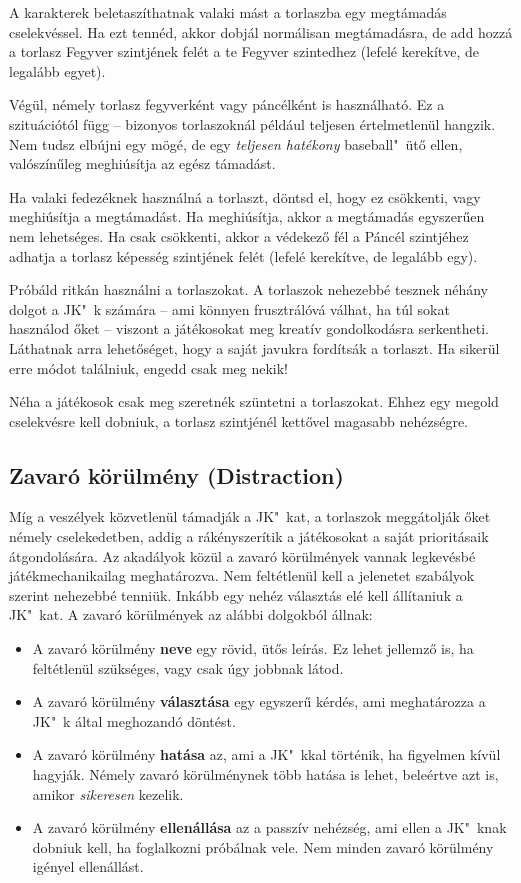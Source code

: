 A karakterek beletaszíthatnak valaki mást a torlaszba egy megtámadás cselekvéssel. Ha ezt tennéd, akkor dobjál normálisan megtámadásra, de add hozzá a torlasz Fegyver szintjének felét a te Fegyver szintedhez (lefelé kerekítve, de legalább egyet).

Végül, némely torlasz fegyverként vagy páncélként is használható. Ez a szituációtól függ -- bizonyos torlaszoknál például teljesen értelmetlenül hangzik. Nem tudsz elbújni egy  mögé, de egy  \emph{teljesen hatékony} baseball"~ütő ellen, valószínűleg meghiúsítja az egész támadást.

Ha valaki fedezéknek használná a torlaszt, döntsd el, hogy ez csökkenti, vagy meghiúsítja a megtámadást. Ha meghiúsítja, akkor a megtámadás egyszerűen nem lehetséges. Ha csak csökkenti, akkor a védekező fél a Páncél szintjéhez adhatja a torlasz képesség szintjének felét (lefelé kerekítve, de legalább egy).

Próbáld ritkán használni a torlaszokat. A torlaszok nehezebbé tesznek néhány dolgot a JK"~k számára -- ami könnyen frusztrálóvá válhat, ha túl sokat használod őket -- viszont a játékosokat meg kreatív gondolkodásra serkentheti. Láthatnak arra lehetőséget, hogy a saját javukra fordítsák a torlaszt. Ha sikerül erre módot találniuk, engedd csak meg nekik!

Néha a játékosok csak meg szeretnék szüntetni a torlaszokat. Ehhez egy megold cselekvésre kell dobniuk, a torlasz szintjénél kettővel magasabb nehézségre.

\newpage

\subsection[Zavaró körülmény]{Zavaró körülmény (Distraction)}

Míg a veszélyek közvetlenül támadják a JK"~kat, a torlaszok meggátolják őket némely cselekedetben, addig a  rákényszerítik a játékosokat a saját prioritásaik átgondolására. Az akadályok közül a zavaró körülmények vannak legkevésbé játékmechanikailag meghatározva. Nem feltétlenül kell a jelenetet szabályok szerint nehezebbé tenniük. Inkább egy nehéz választás elé kell állítaniuk a JK"~kat. A zavaró körülmények az alábbi dolgokból állnak:

\begin{itemize}
    \item A zavaró körülmény \textbf{neve} egy rövid, ütős leírás. Ez lehet jellemző is, ha feltétlenül szükséges, vagy csak úgy jobbnak látod.
    \item A zavaró körülmény \textbf{választása} egy egyszerű kérdés, ami meghatározza a JK"~k által meghozandó döntést.
    \item A zavaró körülmény \textbf{hatása} az, ami a JK"~kkal történik, ha figyelmen kívül hagyják. Némely zavaró körülménynek több hatása is lehet, beleértve azt is, amikor \emph{sikeresen} kezelik.
    \item A zavaró körülmény \textbf{ellenállása} az a passzív nehézség, ami ellen a JK"~knak dobniuk kell, ha foglalkozni próbálnak vele. Nem minden zavaró körülmény igényel ellenállást.
\end{itemize}

